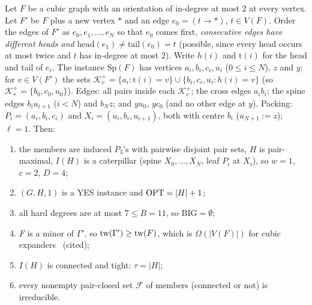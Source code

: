 \begin{proposition}\label{prop:five}
Let $F$ be a cubic graph with an orientation of in-degree at most $2$ at every vertex. Let $F'$ be $F$ plus a new vertex $*$ and an edge $e_0=(t\to *)$, $t\in V(F)$. Order the edges of $F'$ as $e_0,e_1,\dots,e_N$ so that $e_0$ comes first, \emph{consecutive edges have different heads and $\mathrm{head}(e_1)\ne\mathrm{tail}(e_0)=t$} (possible, since every head occurs at most twice and $t$ has in-degree at most $2$). Write $h(i)$ and $\mathrm{t}(i)$ for the head and tail of $e_i$. The instance $\mathrm{Sp}(F)$ has vertices $a_i,b_i,c_i,u_i$ ($0\le i\le N$), $z$ and $y$; for $v\in V(F')$ the sets $\mathcal K_v^+=\{a_i:\mathrm t(i)=v\}\cup\{b_i,c_i,u_i:h(i)=v\}$ (so $\mathcal K_*^+=\{b_0,c_0,u_0\}$). Edges: all pairs inside each $\mathcal K_v^+$; the cross edges $a_ib_i$; the spine edges $b_iu_{i+1}$ ($i<N$) and $b_Nz$; and $yu_0$, $yc_0$ (and no other edge at $y$). Packing: $P_i=(a_i,b_i,c_i)$ and $X_i=(u_i,b_i,u_{i+1})$, both with centre $b_i$ ($u_{N+1}:=z$); $\ell=1$. Then:
\begin{enumerate}
\item[(S1)] the members are induced $P_3$'s with pairwise disjoint pair sets, $H$ is pair-maximal, $I(H)$ is a caterpillar (spine $X_0,\dots,X_N$, leaf $P_i$ at $X_i$), so $w=1$, $c=2$, $D=4$;
\item[(S2)] $(G,H,1)$ is a YES instance and $\mathrm{OPT}=|H|+1$;
\item[(S3)] all hard degrees are at most $7\le B=11$, so $\mathrm{BIG}=\emptyset$;
\item[(S4)] $F$ is a minor of $\Gamma'$, so $\mathrm{tw}(\Gamma')\ge\mathrm{tw}(F)$, which is $\Omega(|V(F)|)$ for cubic expanders~\cite{GM09} (cited);
\item[(S5)] $I(H)$ is connected and tight: $\tau=|H|$;
\item[(S6)] every nonempty pair-closed set $\mathcal F$ of members (connected or not) is irreducible.
\end{enumerate}
\end{proposition}
